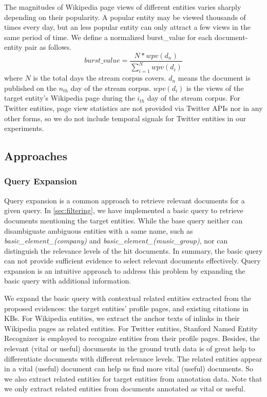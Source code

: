 \documentclass{sig-alternate}
\begin{document}
The magnitudes of Wikipedia page views of different entities varies sharply depending on their popularity. A popular entity may be viewed thousands of times every day, but an less popular entity can only attract a few views in the same period of time. We define a normalized burst\_value for each document-entity pair as follows.
\begin{equation}\label{eq:burstvalue}
burst\_value = \frac{N * wpv(d_{n})}{\sum_{i=1}^N wpv(d_{i})}
\end{equation}
where $N$ is the total days the stream corpus covers.
$d_{n}$ means the document is published on the $n_{th}$ day of the stream corpus. $wpv(d_{i})$ is the views of the target entity's Wikipedia page during the $i_{th}$ day of the stream corpus.
For Twitter entities, page view statistics are not provided via Twitter APIs nor in any other forms, so we do not include temporal signals for Twitter entities in our experiments.

\subsection{Approaches}
\subsubsection{Query Expansion}\label{subsec:query-expansion}
Query expansion is a common approach to retrieve relevant documents for a given query. In \autoref{sec:filtering}, we have implemented a basic query to retrieve documents mentioning the target entities. While the base query neither can disambiguate ambiguous entities with a same name, such as \textit{basic\_element\_(company)} and \textit{basic\_element\_(music\_group)}, nor can distinguish the relevance levels of the hit documents. In summary, the basic query can not provide sufficient evidence to select relevant documents effectively. Query expansion is an intuitive approach to address this problem by expanding the basic query with additional information.

We expand the basic query with contextual related entities extracted from the proposed evidences: the target entities' profile pages, and existing citations in KBs. For Wikipedia entities, we extract the anchor texts of inlinks in their Wikipedia pages as related entities. For Twitter entities, Stanford Named Entity Recognizer \cite{Finkel:2005:INI:1219840.1219885} is employed to recognize entities from their profile pages. Besides, the relevant (vital or useful) documents in the ground truth data is of great help to differentiate documents with different relevance levels. The related entities appear in a vital (useful) document can help us find more vital (useful) documents. So we also extract related entities for target entities from annotation data. Note that we only extract related entities from documents annotated as vital or useful.
\end{document}

